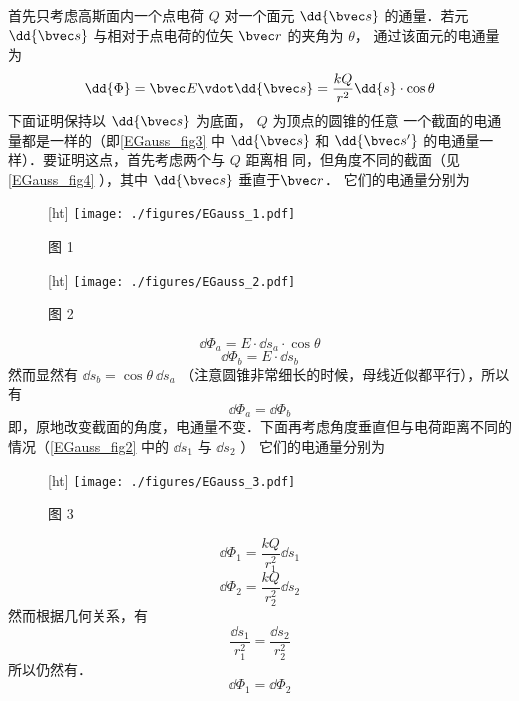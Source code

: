 首先只考虑高斯面内一个点电荷 $Q$ 对一个面元 $\dd{\bvec s}$ 的通量．若元 $\dd{\bvec s}$ 与相对于点电荷的位矢 $\bvec r$ 的夹角为 $\theta$， 通过该面元的电通量为
\begin{equation}
\dd{\Phi} = \bvec E \vdot \dd{\bvec s} = \frac{kQ}{r^2} \dd{s} \cdot \cos \theta 
\end{equation} 
下面证明保持以 $\dd{\bvec s}$ 为底面， $Q$ 为顶点的圆锥的任意
一个截面的电通量都是一样的（即\autoref{EGauss_fig3} 中 $\dd{\bvec s}$ 和 $\dd{\bvec s'}$ 的电通量一样）．要证明这点，首先考虑两个与 $Q$ 距离相
同，但角度不同的截面（见\autoref{EGauss_fig4} ），其中 $\dd{\bvec s}$ 垂直于$\bvec r$． 它们的电通量分别为
\begin{figure}\label{EGauss_fig3}[ht]
\centering
\texttt{[image: ./figures/EGauss\_1.pdf]}
\caption{图 1}
\end{figure}
\begin{figure}\label{EGauss_fig4}[ht]
\centering
\texttt{[image: ./figures/EGauss\_2.pdf]}
\caption{图 2}
\end{figure}

\begin{equation}
\dd{\Phi_a} = E \cdot \dd{s_a} \cdot \cos \theta 
\end{equation} 
\begin{equation}
\dd{\Phi_b} = E \cdot \dd{s_b}
\end{equation}
然而显然有 $\dd{s_b} = \cos\theta \ \dd{s_a} $ （注意圆锥非常细长的时候，母线近似都平行），所以有
\begin{equation}
\dd{\Phi_a} = \dd{\Phi_b}
\end{equation} 
即，原地改变截面的角度，电通量不变．下面再考虑角度垂直但与电荷距离不同的情况（\autoref{EGauss_fig2} 中的 $\dd{s_1}$ 与 $\dd{s_2}$ ） 它们的电通量分别为
\begin{figure}\label{EGauss_fig2}[ht]
\centering
\texttt{[image: ./figures/EGauss\_3.pdf]}
\caption{图 3}
\end{figure}

\begin{equation}
\dd{\Phi_1} = \frac{kQ}{r_1^2} \dd{s_1}
\end{equation}
\begin{equation}
\dd{\Phi_2} = \frac{kQ}{r_2^2} \dd{s_2}
\end{equation}
然而根据几何关系，有
\begin{equation}
\frac{\dd{s_1}}{r_1^2} = \frac{\dd{s_2}}{r_2^2}
\end{equation} 
所以仍然有．
\begin{equation}
\dd{\Phi_1} = \dd{\Phi_2}
\end{equation} 

